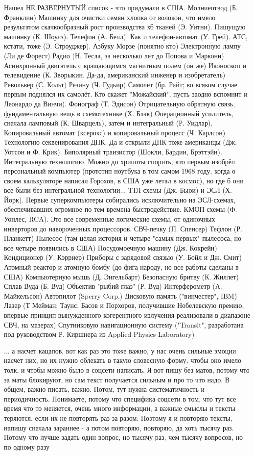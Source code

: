 Нашел НЕ РАЗВЕРНУТЫЙ список - что придумали в США. Молниеотвод (Б. Франклин)
Машинку для очистки семян хлопка от волокон, что имело результатом скачкообразный рост производства хб тканей (Э. Уитни).
Пишущую машинку (К. Шоулз).
Телефон (А. Белл). Как и телефон-автомат (У. Грей). АТС, кстати, тоже (Э. Строуджер).
Азбуку Морзе (понятно кто)
Электронную лампу (Ли де Форест)
Радио (Н. Тесла, за несколько лет до Попова и Маркони)
Асинхронный двигатель с вращающимся магнитным полем (он же)
Иконоскоп и телевидение (К. Зворыкин. Да-да, американский инженер и изобретатель)
Револьвер (С. Кольт)
Резину (Ч. Гудьир)
Самолет (бр. Райт; во всяком случае первым поднялся их самолёт. Кто скажет "Можайский", пусть заодно вспомнит и Леонардо да Винчи).
Фонограф (Т. Эдисон)
Отрицательную обратную связь, фундаментальную вещь в схемотехнике (Х. Блэк)
Операционный усилитель, сначала ламповый (К. Шварцель), затем и интегральный (Р. Уидлар).
Копировальный автомат (ксерокс) и копировальный процесс (Ч. Карлсон)
Технологию секвенирования ДНК. Да и открыли ДНК тоже американцы (Дж. Уотсон и Ф. Крик).
Биполярный транзистор (Шокли, Бардин, Брэттэйн).
Интегральную технологию. Можно до хрипоты спорить, кто первым изобрёл персональный компьютер (прототип ноутбука в том самом 1968 году, когда о своем калькуляторе написал Горохов, в США уже летал в космос), но где б они все были без интегральной технологии...
ТТЛ-схемы (Дж. Бьюи) и ЭСЛ (Х. Йорк). Первые суперкомпьютеры собирались исключительно на ЭСЛ-схемах, обеспечивавших огромное по тем времена быстродействие.
КМОП-схемы (Ф. Уонлес, RCA). Это все современные логические схемы, от одиночных инверторов до навороченных процессоров.
СВЧ-печку (П. Спенсер)
Тефлон (Р. Планкетт)
Пылесос (там целая история и четыре "самых первых" пылесоса, но все четыре появились в США)
Посудомоечную машину (Дж. Кокрейн)
Кондиционер (У. Кэрриер)
Приборы с зарядовой связью (У. Бойл и Дж. Смит)
Атомный реактор и атомную бомбу (до фига народу, но все работы сделаны в США)
Компьютерную мышь (Д. Энгельбарт)
Безопасную бритву (К. Жиллет)
Сплав Вуда (Б. Вуд)
Объектив "рыбий глаз" (Р. Вуд)
Интерферометр (А. Майкельсон)
Автопилот (Sperry Corp.)
Дисковую память ("винчестер", IBM)
Лазер (Т Мейман; Таунс, Басов и Порхоров, получившие Нобелевскую премию, впервые принцип вынужденного когерентного излучения реализовали в диапазоне СВЧ, на мазерах)
Спутниковую навигационную систему ("Transit", разработана под руководством Р. Киршнера из Applied Physics Laboratory)

... а насчет кацапов, вот как раз это тоже важно, у нас очень сильные эмоции насчет
них, но их нужно облекать в такую словесную форму, чтобы оно имело толк, и
чтобы можно было в соцсети написать. Я вот пишу без матов, потому что за маты
блокируют, но сам текст получается сильным и про то что надо. В общем, важно
писать, важно. Потом, тут нужна систематичность и периодичность. Понимаете,
потому что специфика соцсети в том, что тут все время что то меняется, очень много информации,
а важные смыслы и тексты теряются, если их не повторять раз за разом. Поэтому я и повторяю
тексты, - напишу сначала зараннее - а потом повторяю, повторяю, да хоть тысячу раз. Потому что
лучше задать один вопрос, но тысячу раз, чем тысячу вопросов, но по одному разу

